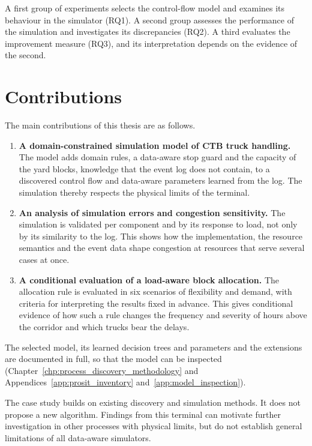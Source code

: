 A first group of experiments selects the control-flow model and examines its
behaviour in the simulator (RQ1). A second group assesses the performance of the
simulation and investigates its discrepancies (RQ2). A third evaluates the
improvement measure (RQ3), and its interpretation depends on the evidence of the
second.

\section{Contributions}

The main contributions of this thesis are as follows.
\begin{enumerate}
\item \textbf{A domain-constrained simulation model of CTB truck handling.} The
model adds domain rules, a data-aware stop guard and the capacity of the yard blocks, knowledge
that the event log does not contain, to a discovered control flow and data-aware
parameters learned from the log. The simulation thereby respects the physical limits of the terminal.
\item \textbf{An analysis of simulation errors and congestion sensitivity.} The
simulation is validated per component and by its response to load, not only by its
similarity to the log. This shows how the implementation, the resource semantics and
the event data shape congestion at resources that serve several cases at once.
\item \textbf{A conditional evaluation of a load-aware block allocation.} The
allocation rule is evaluated in six scenarios of flexibility and demand, with criteria
for interpreting the results fixed in advance. This gives conditional evidence of how such a rule
changes the frequency and severity of hours above the corridor and which trucks bear
the delays.
\end{enumerate}


The selected model, its learned decision trees and parameters and the extensions are
documented in full, so that the model can be inspected
(Chapter~\ref{chp:process_discovery_methodology} and
Appendices~\ref{app:prosit_inventory} and~\ref{app:model_inspection}).




The case study builds on existing discovery and simulation methods. It does not
propose a new algorithm. Findings from this terminal can motivate further
investigation in other processes with physical limits, but do not establish general
limitations of all data-aware simulators.


